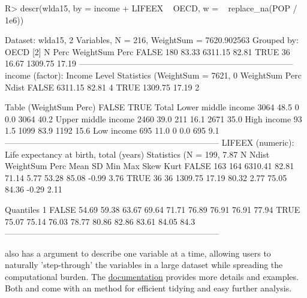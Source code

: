 \documentclass[nojss]{jss} %
\newcommand{\fct}[1]{\code{#1()}}
\begin{document}
%
\begin{Schunk}
\begin{Sinput}
R> descr(wlda15, by = income + LIFEEX ~ OECD, w = ~ replace_na(POP / 1e6))
\end{Sinput}
\begin{Soutput}
Dataset: wlda15, 2 Variables, N = 216, WeightSum = 7620.902563
Grouped by: OECD [2]
         N   Perc  WeightSum   Perc
FALSE  180  83.33    6311.15  82.81
TRUE    36  16.67    1309.75  17.19
-----------------------------------------------------------------------------
income (factor): Income Level
Statistics (WeightSum = 7621, 0% NAs)
       WeightSum   Perc  Ndist
FALSE    6311.15  82.81      4
TRUE     1309.75  17.19      2

Table (WeightSum Perc)
                         FALSE       TRUE      Total
Lower middle income  3064 48.5     0  0.0  3064 40.2
Upper middle income  2460 39.0   211 16.1  2671 35.0
High income            93  1.5  1099 83.9  1192 15.6
Low income            695 11.0     0  0.0   695  9.1
-----------------------------------------------------------------------------
LIFEEX (numeric): Life expectancy at birth, total (years)
Statistics (N = 199, 7.87% NAs)
         N  Ndist  WeightSum   Perc   Mean    SD    Min    Max   Skew  Kurt
FALSE  163    164    6310.41  82.81  71.14  5.77  53.28  85.08  -0.99  3.76
TRUE    36     36    1309.75  17.19  80.32  2.77  75.05  84.36  -0.29  2.11

Quantiles
          1%     5%    10%    25%    50%    75%    90%    95%    99%
FALSE  54.69  59.38  63.67  69.64  71.71  76.89  76.91  76.91  77.94
TRUE   75.07  75.14  76.03  78.77  80.86  82.86  83.61  84.05   84.3
-----------------------------------------------------------------------------
\end{Soutput}
\end{Schunk}

%
\fct{descr} also has a  argument to describe one variable at a time, allowing users to naturally 'step-through' the variables in a large dataset while spreading the computational burden. The \href{https://sebkrantz.github.io/collapse/reference/descr.html}{documentation} provides more details and examples. Both \fct{qsu} and \fct{descr} come with an  method for efficient tidying and easy further analysis. \newline
\end{document}
